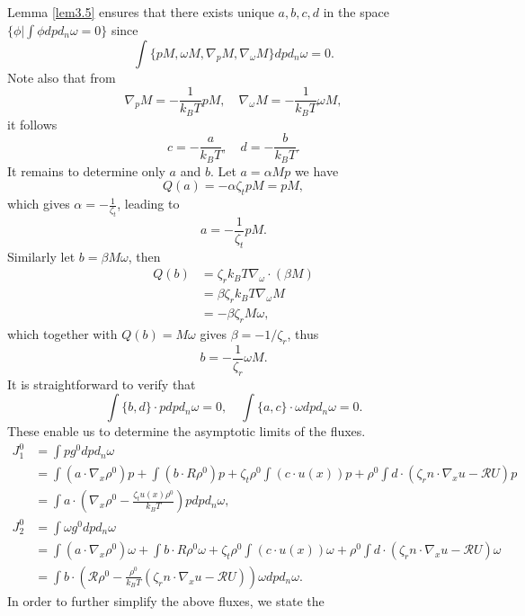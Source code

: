 \documentclass[reqno]{amsart}
\numberwithin{equation}{section}
\theoremstyle{definition}
\theoremstyle{remark}
\begin{document}
Lemma \ref{lem3.5}  ensures that there exists unique $a, b, c, d$ in
the space $\{\phi|\int \phi dpd_n\omega =0\}$ since
$$
\int \{pM, \omega M, \nabla_p M, \nabla_\omega M\}dpd_n\omega=0.
$$
Note also that from
$$
\nabla_p M= -\frac{1}{k_BT}pM, \quad \nabla_\omega M= -\frac{1}{k_BT}\omega M,
$$
it follows
\begin{equation}\label{cd}
    c=-\frac{a}{k_BT}, \quad d=-\frac{b}{k_BT}.
\end{equation}
It remains to determine only $a$ and $b$. Let $a=\alpha Mp$ we have
$$
Q(a)=-\alpha \zeta_t pM=pM,
$$
which gives $\alpha =-\frac{1}{\zeta_t}$, leading to
\begin{equation}\label{a}
a=-\frac{1}{\zeta_t}pM.
\end{equation}
Similarly let $b=\beta M\omega$, then
\begin{align*}
Q(b) &= \zeta_rk_BT\nabla_\omega \cdot (\beta M)\\
&=\beta \zeta_rk_BT \nabla_\omega M \\
&=-\beta \zeta_r  M \omega,
\end{align*}
which together with $Q(b)=M\omega$ gives $\beta=-1/\zeta_r$, thus
\begin{equation}\label{b}
b=-\frac{1}{\zeta_r} \omega M.
\end{equation}
It is straightforward to verify that
$$
\int \{b, d\}\cdot pdpd_n\omega =0, \quad \int \{a, c\}\cdot \omega dp d_n\omega=0.
$$
These enable us to determine the asymptotic limits of the fluxes.
\begin{align*}
J_1^0 &= \int pg^0 dpd_n\omega \\
& = \int (a\cdot\nabla_x \rho^0) p  +\int (b\cdot R \rho^0 )p +
\zeta_t  \rho^0 \int (c \cdot u(x)) p
+\rho^0 \int d\cdot (\zeta_r n\cdot  \nabla_x u-\mathcal{R}U )p \\
& =\int a\cdot \left(\nabla_x \rho^0- \frac{\zeta_t u(x)\rho^0}{k_B T} \right) p dpd_n\omega,
\end{align*}
\begin{align*}
J_2^0 &= \int \omega g^0 dpd_n\omega \\
& = \int (a\cdot \nabla_x \rho^0)\omega  +\int b\cdot R \rho^0  \omega
+ \zeta_t \rho^0 \int (c \cdot u(x)) \omega
+\rho^0 \int d\cdot (\zeta_r n\cdot \nabla_x u-\mathcal{R}U) \omega\\
& =\int b \cdot\left(\mathcal{R} \rho^0- \frac{\rho^0}{k_B T}(\zeta_r n\cdot \nabla_x u-\mathcal{R}U) \right) \omega dpd_n\omega.
\end{align*}
In order to further simplify the above fluxes, we state the
\end{document}
